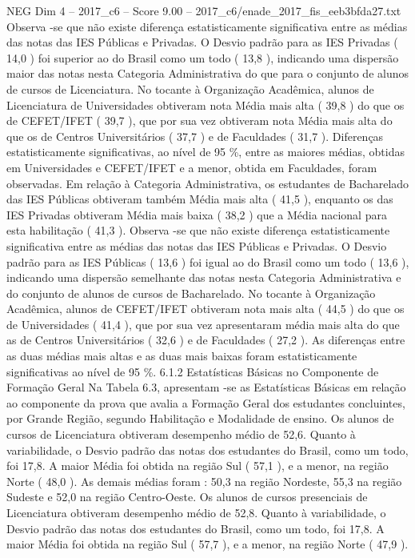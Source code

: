 \begin{textsample}{NEG Dim 4 – 2017\_c6 – Score 9.00 – 2017\_c6/enade\_2017\_fis\_eeb3bfda27.txt}
Observa -se que não existe diferença estatisticamente significativa entre as médias das notas das IES Públicas e Privadas.
O Desvio padrão para as IES Privadas ( 14,0 ) foi superior ao do Brasil como um todo ( 13,8 ), indicando uma dispersão maior das notas nesta Categoria Administrativa do que para o conjunto de alunos de cursos de Licenciatura.
No tocante à Organização Acadêmica, alunos de Licenciatura de Universidades obtiveram nota Média mais alta ( 39,8 ) do que os de CEFET/IFET ( 39,7 ), que por sua vez obtiveram nota Média mais alta do que os de Centros Universitários ( 37,7 ) e de Faculdades ( 31,7 ).
Diferenças estatisticamente significativas, ao nível de 95 \%, entre as maiores médias, obtidas em Universidades e CEFET/IFET e a menor, obtida em Faculdades, foram observadas.
Em relação à Categoria Administrativa, os estudantes de Bacharelado das IES Públicas obtiveram também Média mais alta ( 41,5 ), enquanto os das IES Privadas obtiveram Média mais baixa ( 38,2 ) que a Média nacional para esta habilitação ( 41,3 ).
Observa -se que não existe diferença estatisticamente significativa entre as médias das notas das IES Públicas e Privadas.
O Desvio padrão para as IES Públicas ( 13,6 ) foi igual ao do Brasil como um todo ( 13,6 ), indicando uma dispersão semelhante das notas nesta Categoria Administrativa e do conjunto de alunos de cursos de Bacharelado.
No tocante à Organização Acadêmica, alunos de CEFET/IFET obtiveram nota mais alta ( 44,5 ) do que os de Universidades ( 41,4 ), que por sua vez apresentaram média mais alta do que as de Centros Universitários ( 32,6 ) e de Faculdades ( 27,2 ).
As diferenças entre as duas médias mais altas e as duas mais baixas foram estatisticamente significativas ao nível de 95 \%. 6.1.2 Estatísticas Básicas no Componente de Formação Geral Na Tabela 6.3, apresentam -se as Estatísticas Básicas em relação ao componente da prova que avalia a Formação Geral dos estudantes concluintes, por Grande Região, segundo Habilitação e Modalidade de ensino.
Os alunos de cursos de Licenciatura obtiveram desempenho médio de 52,6.
Quanto à variabilidade, o Desvio padrão das notas dos estudantes do Brasil, como um todo, foi 17,8.
A maior Média foi obtida na região Sul ( 57,1 ), e a menor, na região Norte ( 48,0 ).
As demais médias foram : 50,3 na região Nordeste, 55,3 na região Sudeste e 52,0 na região Centro-Oeste.
Os alunos de cursos presenciais de Licenciatura obtiveram desempenho médio de 52,8.
Quanto à variabilidade, o Desvio padrão das notas dos estudantes do Brasil, como um todo, foi 17,8.
A maior Média foi obtida na região Sul ( 57,7 ), e a menor, na região Norte ( 47,9 ).

\end{textsample}
